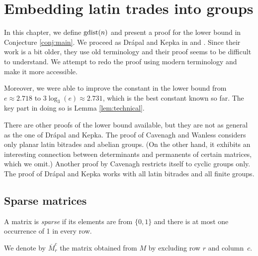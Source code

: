 \chapter{Embedding latin trades into groups}
\label{chap:lower-bound}

In this chapter, we define $\mathop{\mathrm{gdist}}(n)$ and present a proof for the lower bound in Conjecture \ref{conj:main}. We proceed as Drápal and Kepka in \cite{DrapalKepka89} and \cite{DrapalKepka85}. Since their work is a bit older, they use old terminology and their proof seems to be difficult to understand. We attempt to redo the proof using modern terminology and make it more accessible.

Moreover, we were able to improve the constant in the lower bound from $e \approx 2.718$ to $3 \log_3(e) \approx 2.731$, which is the best constant known so far. The key part in doing so is Lemma \ref{lem:technical}.

There are other proofs of the lower bound available, but they are not as general as the one of Drápal and Kepka. The proof of Cavenagh and Wanless \cite{CavenaghWanless09} considers only planar latin bitrades and abelian groups. (On the other hand, it exhibits an interesting connection between determinants and permanents of certain matrices, which we omit.) Another proof by Cavenagh \cite{Cavenagh03} restricts itself to cyclic groups only. %
The proof of Drápal and Kepka works with all latin bitrades and all finite groups.

\section{Sparse matrices}

\begin{defn}
A matrix is \emph{sparse} if its elements are from $\{0,1\}$ and there is at most one occurrence of 1 in every row.
\end{defn}

We denote by $\overbar{M}_r^c$ the matrix obtained from $M$ by excluding row $r$ and column~$c$.

